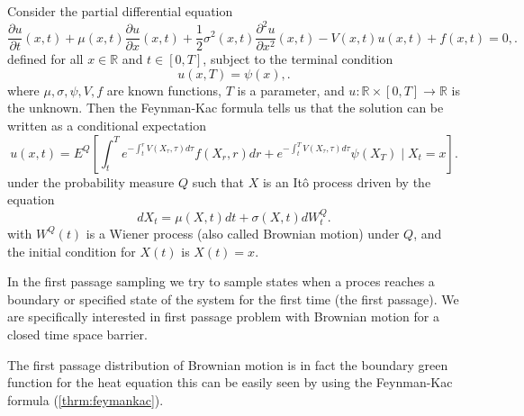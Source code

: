 \documentclass[a4paper,12pt]{article}
\begin{document}
\begin{theorem} \label{thrm:feymankac}

    Consider the partial differential equation
    \begin{equation}
        \frac{\partial u}{\partial t}(x, t)+\mu(x, t) \frac{\partial u}{\partial x}(x, t)+\frac{1}{2} \sigma^2(x, t) \frac{\partial^2 u}{\partial x^2}(x, t)-V(x, t) u(x, t)+f(x, t)=0,
        .
    \end{equation}
    defined for all $x \in \mathbb{R}$ and $t \in[0, T]$, subject to the terminal condition
    \begin{equation}
        u(x, T)=\psi(x),
        .
    \end{equation}
    where $\mu, \sigma, \psi, V, f$ are known functions, $T$ is a parameter, and $u: \mathbb{R} \times[0, T] \rightarrow \mathbb{R}$ is the unknown. Then the Feynman-Kac formula tells us that the solution can be written as a conditional expectation
    \begin{equation}
        u(x, t)=E^Q\left[\int_t^T e^{-\int_t^r V\left(X_\tau, \tau\right) d \tau} f\left(X_r, r\right) d r+e^{-\int_t^T V\left(X_\tau, \tau\right) d \tau} \psi\left(X_T\right) \mid X_t=x\right]
        .
    \end{equation}
    under the probability measure $Q$ such that $X$ is an Itô process driven by the equation
    \begin{equation}
        d X_t=\mu(X, t) d t+\sigma(X, t) d W_t^Q
        .
    \end{equation}
    with $W^Q(t)$ is a Wiener process (also called Brownian motion) under $Q$, and the initial condition for $X(t)$ is $X(t)=x$.
\end{theorem}

\begin{definition} \label{def:first passage}
    In the first passage sampling we try to sample states when a proces
    reaches a boundary or specified state of the system for the first time
    (the first passage). We are specifically interested in
    first passage problem with Brownian motion for a closed time space barrier.
\end{definition}

The first passage distribution of Brownian motion is in fact the boundary
green function for the heat equation this can be easily seen by using the
Feynman-Kac formula (\ref{thrm:feymankac}).
\end{document}
